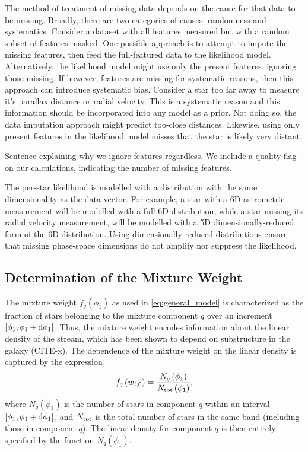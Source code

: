 \documentclass[twocolumn]{aastex631}
\begin{document}
            The method of treatment of missing data depends on the cause for that data to be missing.
            Broadly, there are two categories of causes: randomness and systematics.
            Consider a dataset with all features measured but with a random subset of features masked.
            One possible approach is to attempt to impute the missing features, then feed the full-featured data to the likelihood model. Alternatively, the likelihood model might use only the present features, ignoring those missing. If however, features are missing for systematic reasons, then this approach can introduce systematic bias. Consider a star too far away to measure it's parallax distance or radial velocity. This is a systematic reason and this information should be incorporated into any model as a prior. Not doing so, the data imputation approach might predict too-close distances. Likewise, using only present features in the likelihood model misses that the star is likely very distant.

            {\color{red} Sentence explaining why we ignore features regardless.}
            We include a quality flag on our calculations, indicating the number of missing features.

            The per-star likelihood is modelled with a distribution with the same dimensionality as the data vector.
            For example, a star with a 6D astrometric measurement will be modelled with a full 6D distribution, while a star missing its radial velocity measurement, will be modelled with a 5D dimensionally-reduced form of the 6D distribution. Using dimensionally reduced distributions ensure that missing phase-space dimensions do not amplify nor suppress the likelihood.



    \subsection{Determination of the Mixture Weight} \label{sub:mixture_weight}
        The mixture weight $f_q(\phi_1)$ as used in \autoref{eq:general_model} is characterized as the fraction of stars belonging to the mixture component $q$ over an increment $[\phi_1, \phi_1 + \dif{\phi_1}]$. Thus, the mixture weight encodes information about the linear density of the stream, which has been shown to depend on substructure in the galaxy (CITE-x). The dependence of the mixture weight on the linear density is captured by the expression
        \begin{equation}\label{eq:fraction_param}
            f_q\left(w_{i,0}\right) = \frac{N_q\left(\phi_1\right)}{N_{\rm tot}\left(\phi_1\right)},
        \end{equation}
        where $N_q\left(\phi_1\right)$ is the number of stars in component $q$ within an interval $[\phi_1, \phi_1 + \dif{\phi_1}]$, and 
        $N_{\rm tot}$ is the total number of stars in the same band (including those in component $q$). The linear  density for component $q$ is then entirely specified by the function $N_q(\phi_1)$.
\end{document}
